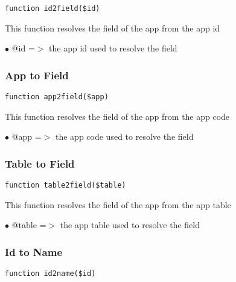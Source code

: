 \documentclass[a4paper]{article}
\begin{document}
\begin{lstlisting}
function id2field($id)
\end{lstlisting}

This function resolves the field of the app from the app id

\begin{compactitem}
\item[\color{myblue}$\bullet$] @id =$>$ the app id used to resolve the field
\end{compactitem}

\hypertarget{toc39}{}
\subsubsection{App to Field}

\begin{lstlisting}
function app2field($app)
\end{lstlisting}

This function resolves the field of the app from the app code

\begin{compactitem}
\item[\color{myblue}$\bullet$] @app =$>$ the app code used to resolve the field
\end{compactitem}

\hypertarget{toc40}{}
\subsubsection{Table to Field}

\begin{lstlisting}
function table2field($table)
\end{lstlisting}

This function resolves the field of the app from the app table

\begin{compactitem}
\item[\color{myblue}$\bullet$] @table =$>$ the app table used to resolve the field
\end{compactitem}

\hypertarget{toc41}{}
\subsubsection{Id to Name}

\begin{lstlisting}
function id2name($id)
\end{lstlisting}
\end{document}
